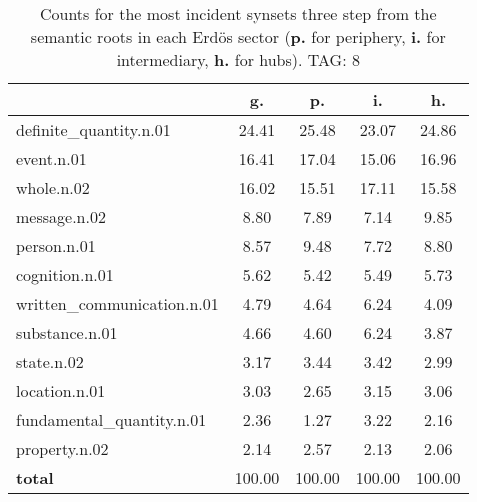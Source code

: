 \begin{table}[h!]
\begin{center}
\begin{tabular}{| l | c | c | c | c |}\hline
 & g. & p. & i. & h. \\\hline
definite\_quantity.n.01 & 24.41  & 25.48  & 23.07  & 24.86 \\\hline
event.n.01 & 16.41  & 17.04  & 15.06  & 16.96 \\\hline
whole.n.02 & 16.02  & 15.51  & 17.11  & 15.58 \\\hline
message.n.02 & 8.80  & 7.89  & 7.14  & 9.85 \\\hline
person.n.01 & 8.57  & 9.48  & 7.72  & 8.80 \\\hline
cognition.n.01 & 5.62  & 5.42  & 5.49  & 5.73 \\\hline
written\_communication.n.01 & 4.79  & 4.64  & 6.24  & 4.09 \\\hline
substance.n.01 & 4.66  & 4.60  & 6.24  & 3.87 \\\hline
state.n.02 & 3.17  & 3.44  & 3.42  & 2.99 \\\hline
location.n.01 & 3.03  & 2.65  & 3.15  & 3.06 \\\hline
fundamental\_quantity.n.01 & 2.36  & 1.27  & 3.22  & 2.16 \\\hline
property.n.02 & 2.14  & 2.57  & 2.13  & 2.06 \\\hline
{{\bf total}} & 100.00  & 100.00  & 100.00  & 100.00 \\\hline
\end{tabular}
\caption{Counts for the most incident synsets three step from the semantic roots in each Erd\"os sector ({\bf p.} for periphery, {\bf i.} for intermediary, {\bf h.} for hubs). TAG: 8}
\end{center}
\end{table}